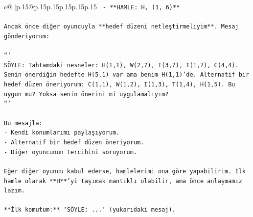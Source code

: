 \documentclass{article}
\begin{document}
{\begin{supertabular}{c@{$\;$}|p{.15\linewidth}@{}p{.15\linewidth}p{.15\linewidth}p{.15\linewidth}p{.15\linewidth}p{.15\linewidth}}
{{{\texttt{   {-} **HAMLE: H, (1, 6)**} \\
\\ 
\texttt{Ancak önce diğer oyuncuyla **hedef düzeni netleştirmeliyim**. Mesaj gönderiyorum:} \\
\\ 
\texttt{```} \\
\texttt{SÖYLE: Tahtamdaki nesneler: H(1,1), W(2,7), I(3,7), T(1,7), C(4,4). Senin önerdiğin hedefte H(5,1) var ama benim H(1,1)'de. Alternatif bir hedef düzen öneriyorum: C(1,1), W(1,2), I(1,3), T(1,4), H(1,5). Bu uygun mu? Yoksa senin önerini mi uygulamalıyım?} \\
\texttt{```} \\
\\ 
\texttt{Bu mesajla:} \\
\texttt{{-} Kendi konumlarımı paylaşıyorum.} \\
\texttt{{-} Alternatif bir hedef düzen öneriyorum.} \\
\texttt{{-} Diğer oyuncunun tercihini soruyorum.} \\
\\ 
\texttt{Eğer diğer oyuncu kabul ederse, hamlelerimi ona göre yapabilirim. İlk hamle olarak **H**'yi taşımak mantıklı olabilir, ama önce anlaşmamız lazım.} \\
\\ 
\texttt{**İlk komutum:** `SÖYLE: ...` (yukarıdaki mesaj).} \\
            }
        }
    }
     \\ \\


\end{supertabular}}
\end{document}
